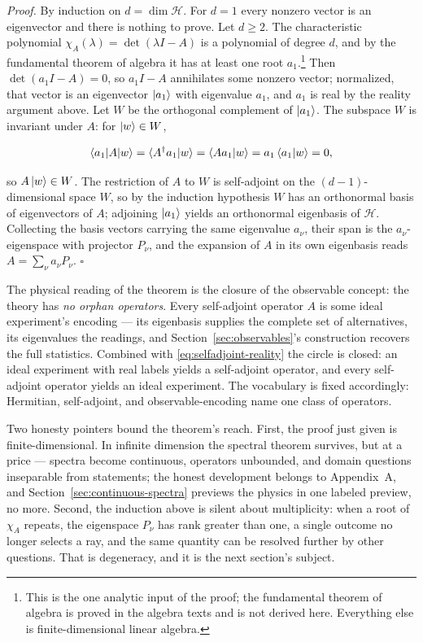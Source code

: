 \medskip\noindent\emph{Proof.} By induction on $d=\dim\mathcal H$. For $d=1$ every nonzero vector is an eigenvector and there is nothing to prove. Let $d\geq2$. The characteristic polynomial $\chi_A(\lambda)=\det(\lambda I-A)$ is a polynomial of degree $d$, and by the fundamental theorem of algebra it has at least one root $a_1$.\footnote{This is the one analytic input of the proof; the fundamental theorem of algebra is proved in the algebra texts and is not derived here. Everything else is finite-dimensional linear algebra.} Then $\det(a_1I-A)=0$, so $a_1I-A$ annihilates some nonzero vector; normalized, that vector is an eigenvector $\ket{a_1}$ with eigenvalue $a_1$, and $a_1$ is real by the reality argument above. Let $W$ be the orthogonal complement of $\ket{a_1}$. The subspace $W$ is invariant under $A$: for $\ket{w}\in W$,
\begin{linenomath}
\begin{equation}
    \braket{a_1|A|w}=\braket{A^\dagger a_1|w}=\braket{A a_1|w}=a_1\braket{a_1|w}=0 ,
\end{equation}
\end{linenomath}
so $A\ket{w}\in W$. The restriction of $A$ to $W$ is self-adjoint on the $(d-1)$-dimensional space $W$, so by the induction hypothesis $W$ has an orthonormal basis of eigenvectors of $A$; adjoining $\ket{a_1}$ yields an orthonormal eigenbasis of $\mathcal H$. Collecting the basis vectors carrying the same eigenvalue $a_\nu$, their span is the $a_\nu$-eigenspace with projector $P_\nu$, and the expansion of $A$ in its own eigenbasis reads $A=\sum_\nu a_\nu P_\nu$. \hfill$\square$

The physical reading of the theorem is the closure of the observable concept: the theory has \emph{no orphan operators}. Every self-adjoint operator $A$ is some ideal experiment's encoding --- its eigenbasis supplies the complete set of alternatives, its eigenvalues the readings, and Section~\ref{sec:observables}'s construction recovers the full statistics. Combined with \eqref{eq:selfadjoint-reality} the circle is closed: an ideal experiment with real labels yields a self-adjoint operator, and every self-adjoint operator yields an ideal experiment. The vocabulary is fixed accordingly: Hermitian, self-adjoint, and observable-encoding name one class of operators.

Two honesty pointers bound the theorem's reach. First, the proof just given is finite-dimensional. In infinite dimension the spectral theorem survives, but at a price --- spectra become continuous, operators unbounded, and domain questions inseparable from statements; the honest development belongs to Appendix~A, and Section~\ref{sec:continuous-spectra} previews the physics in one labeled preview, no more. Second, the induction above is silent about multiplicity: when a root of $\chi_A$ repeats, the eigenspace $P_\nu$ has rank greater than one, a single outcome no longer selects a ray, and the same quantity can be resolved further by other questions. That is degeneracy, and it is the next section's subject.

